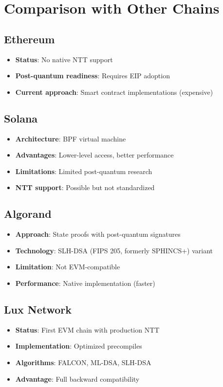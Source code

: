 \section{Comparison with Other Chains}


\subsection{Ethereum}

\begin{itemize}
\item \textbf{Status}: No native NTT support
\item \textbf{Post-quantum readiness}: Requires EIP adoption
\item \textbf{Current approach}: Smart contract implementations (expensive)
\end{itemize}

\subsection{Solana}

\begin{itemize}
\item \textbf{Architecture}: BPF virtual machine
\item \textbf{Advantages}: Lower-level access, better performance
\item \textbf{Limitations}: Limited post-quantum research
\item \textbf{NTT support}: Possible but not standardized
\end{itemize}

\subsection{Algorand}

\begin{itemize}
\item \textbf{Approach}: State proofs with post-quantum signatures
\item \textbf{Technology}: SLH-DSA (FIPS 205, formerly SPHINCS+) variant
\item \textbf{Limitation}: Not EVM-compatible
\item \textbf{Performance}: Native implementation (faster)
\end{itemize}

\subsection{Lux Network}

\begin{itemize}
\item \textbf{Status}: First EVM chain with production NTT
\item \textbf{Implementation}: Optimized precompiles
\item \textbf{Algorithms}: FALCON, ML-DSA, SLH-DSA
\item \textbf{Advantage}: Full backward compatibility
\end{itemize}

